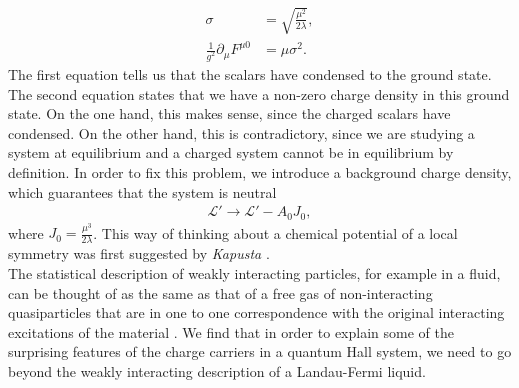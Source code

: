         \begin{align}
            \sigma &= \sqrt{\frac{\mu^2}{2\lambda}}  \label{eq:chem_pot_local_symmetry_eom1}, \\
            \frac{1}{g^2} \partial_{\mu} F^{\mu 0} &= \mu \sigma^2. \label{eq:chem_pot_local_symmetry_eom2}
        \end{align}
        The first equation tells us that the scalars have condensed to the ground state. The second equation states that we have a non-zero charge density in this ground state. On the one hand, this makes sense, since the charged scalars have condensed. On the other hand, this is contradictory, since we are studying a system at equilibrium and a charged system cannot be in equilibrium by definition. In order to fix this problem, we introduce a background charge density, which guarantees that the system is neutral 
        \begin{align}
            \mathcal{L}' \rightarrow \mathcal{L}' - A_0 J_0,
        \end{align}
        where $J_0 = \frac{\mu^3}{2\lambda}$. This way of thinking about a chemical potential of a local symmetry was first suggested by \textit{Kapusta} \cite{PhysRevD.24.426}. \\
        \indent The statistical description of weakly interacting particles, for example in a fluid, can be thought of as the same as that of a free gas of non-interacting quasiparticles that are in one to one correspondence with the original interacting excitations of the material \cite{Landau:1956zuh}. We find that in order to explain some of the surprising features of the charge carriers in a quantum Hall system, we need to go beyond the weakly interacting description of a Landau-Fermi liquid.
